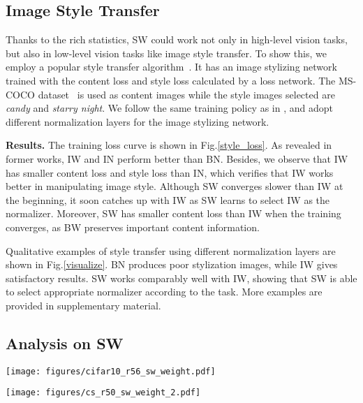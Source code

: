 \documentclass[10pt,twocolumn,letterpaper]{article}
\begin{document}
\subsection{Image Style Transfer}

Thanks to the rich statistics, SW could work not only in high-level vision tasks, but also in low-level vision tasks like image style transfer.
To show this, we employ a popular style transfer algorithm~\cite{johnson2016perceptual}.
It has an image stylizing network trained with the content loss and style loss calculated by a loss network.
The MS-COCO dataset~\cite{lin2014microsoft} is used as content images while the style images selected are \textit{candy} and \textit{starry night}.
We follow the same training policy as in \cite{johnson2016perceptual}, and adopt different normalization layers for the image stylizing network.

\noindent\textbf{Results.}
The training loss curve is shown in Fig.\ref{style_loss}.
As revealed in former works, IW and IN perform better than BN.
Besides, we observe that IW has smaller content loss and style loss than IN, which verifies that IW works better in manipulating image style.
Although SW converges slower than IW at the beginning, it soon catches up with IW as SW learns to select IW as the normalizer.
Moreover, SW has smaller content loss than IW when the training converges, as BW preserves important content information.

Qualitative examples of style transfer using different normalization layers are shown in Fig.\ref{visualize}.
BN produces poor stylization images, while IW gives satisfactory results.
SW works comparably well with IW, showing that SW is able to select appropriate normalizer according to the task.
More examples are provided in supplementary material.


\subsection{Analysis on SW}

\begin{figure*}[t!]
	\centering
	\texttt{[image: figures/cifar10\_r56\_sw\_weight.pdf]}
	\caption{Learning curve of importance weights in ResNet56 on CIFAR-10. (a) and (b) show  and  in SW with  \{bw, iw\}. (c) and (d) correspond to  and  in SW with  \{bw, iw, bn, in, ln\}.}
	\label{CIFAR10_weight}
\end{figure*}

\begin{figure*}[t!]
	\centering
	\texttt{[image: figures/cs\_r50\_sw\_weight\_2.pdf]}
	\caption{Learning curve of importance weights in ResNet50 on Cityscapes. (a)(b)(c)(d) have the same meanings as in Fig.\ref{CIFAR10_weight}.}
	\label{cs_weight}
\end{figure*}
\end{document}

